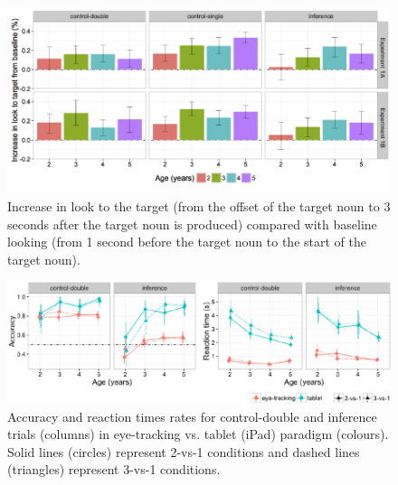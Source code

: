 \documentclass{rsos}
\begin{document}
\begin{figure}[!h]

{\centering \includegraphics{figs/et_difference-1} 

}

\caption[Increase in look to the target (from the offset of the target noun to 3 seconds after the target noun is produced) compared with baseline looking (from 1 second before the target noun to the start of the target noun)]{Increase in look to the target (from the offset of the target noun to 3 seconds after the target noun is produced) compared with baseline looking (from 1 second before the target noun to the start of the target noun).}\label{fig:et_difference}
\end{figure}

\begin{figure}[!h]

{\centering \includegraphics{figs/etip_compd-1} 

}

\caption[Accuracy and reaction times rates for control-double and inference trials (columns) in eye-tracking vs]{Accuracy and reaction times rates for control-double and inference trials (columns) in eye-tracking vs. tablet (iPad) paradigm (colours). Solid lines (circles) represent 2-vs-1 conditions and dashed lines (triangles) represent 3-vs-1 conditions.}\label{fig:etip_compd}
\end{figure}

\end{document}
